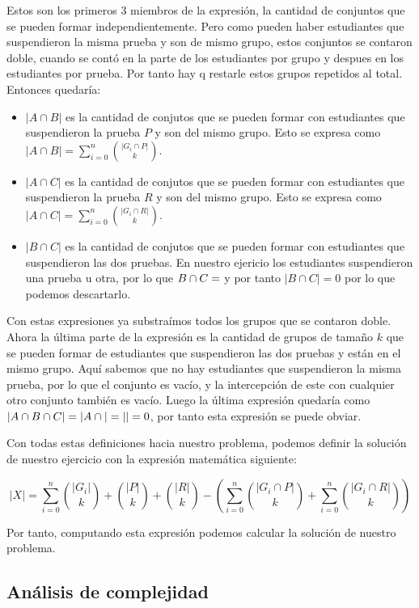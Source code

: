 \documentclass{article}
\begin{document}
Estos son los primeros 3 miembros de la expresión, la cantidad de conjuntos que se pueden formar independientemente. Pero como pueden haber estudiantes que suspendieron la misma prueba y son de mismo grupo, estos conjuntos se contaron doble, cuando se contó en la parte de los estudiantes por grupo y despues en los estudiantes por prueba. Por tanto hay q restarle estos grupos repetidos al total. Entonces quedaría:

\begin{itemize}
    \item $|A \cap B|$ es la cantidad de conjutos que se pueden formar con estudiantes que suspendieron la prueba $P$ y son del mismo grupo. Esto se expresa como $|A \cap B| = \sum_{i=0}^{n} {|G_i \cap P| \choose k}$.
    \item $|A \cap C|$ es la cantidad de conjutos que se pueden formar con estudiantes que suspendieron la prueba $R$ y son del mismo grupo. Esto se expresa como $|A \cap C| = \sum_{i=0}^{n} {|G_i \cap R| \choose k}$.
    \item $|B \cap C|$ es la cantidad de conjutos que se pueden formar con estudiantes que suspendieron las dos pruebas. En nuestro ejericio los estudiantes suspendieron una prueba u otra, por lo que $B \cap C = \empty$ y por tanto $|B \cap C| = 0$ por lo que podemos descartarlo.
\end{itemize}

Con estas expresiones ya substraímos todos los grupos que se contaron doble. Ahora la última parte de la expresión es la cantidad de grupos de tamaño $k$ que se pueden formar de estudiantes que suspendieron las dos pruebas y están en el mismo grupo. Aquí sabemos que no hay estudiantes que suspendieron la misma prueba, por lo que el conjunto es vacío, y la intercepción de este con cualquier otro conjunto también es vacío. Luego la última expresión quedaría como $|A \cap B \cap C| = |A \cap \empty| = |\empty| = 0$, por tanto esta expresión se puede obviar.

Con todas estas definiciones hacia nuestro problema, podemos definir la solución de nuestro ejercicio con la expresión matemática siguiente:

$$
    |X| = \sum_{i=0}^{n} {|G_i| \choose k} + {|P| \choose k} + {|R| \choose k} - (\sum_{i=0}^{n} {|G_i \cap P| \choose k} + \sum_{i=0}^{n} {|G_i \cap R| \choose k})
$$

Por tanto, computando esta expresión podemos calcular la solución de nuestro problema.

\subsection{Análisis de complejidad}
\end{document}
